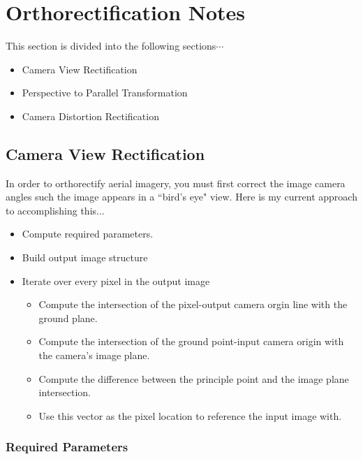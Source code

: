 \chapter*{Orthorectification Notes}

This section is divided into the following sections$\cdots$

\begin{itemize}
\item[] Camera View Rectification
\item[] Perspective to Parallel Transformation
\item[] Camera Distortion Rectification
\end{itemize}
  
\section*{Camera View Rectification}

In order to orthorectify aerial imagery, you must first correct the image camera angles
such the image appears in a ``bird's eye" view.  Here is my current approach to accomplishing this...

\begin{itemize}
\item[] Compute required parameters.
\item[] Build output image structure
\item[] Iterate over every pixel in the output image
    \begin{itemize}
    \item[] Compute the intersection of the pixel-output camera orgin line with the ground plane.
    \item[] Compute the intersection of the ground point-input camera origin with the camera's image plane.
    \item[] Compute the difference between the principle point and the image plane intersection. 
    \item[] Use this vector as the pixel location to reference the input image with. 
    \end{itemize}
\end{itemize}

\subsection*{Required Parameters}


